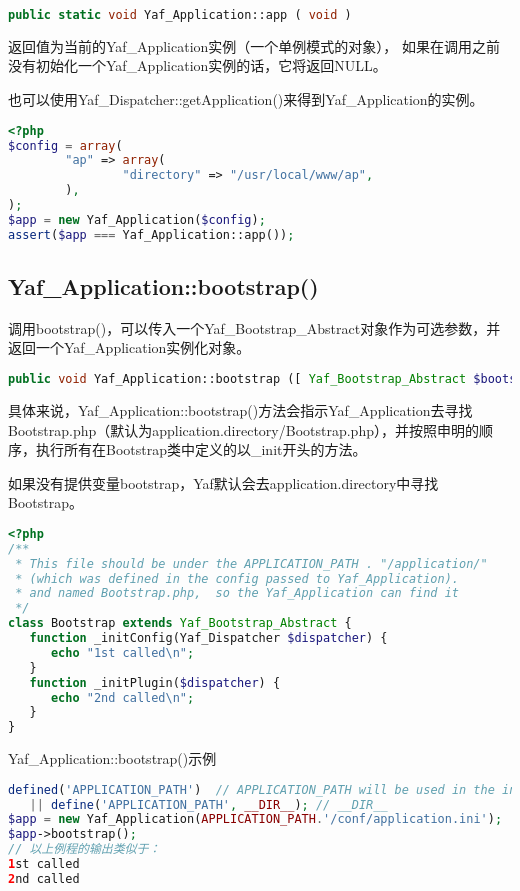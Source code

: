 \begin{lstlisting}[language=PHP]
public static void Yaf_Application::app ( void )
\end{lstlisting}

返回值为当前的Yaf\_Application实例（一个单例模式的对象）， 如果在调用之前没有初始化一个Yaf\_Application实例的话，它将返回NULL。

也可以使用Yaf\_Dispatcher::getApplication()来得到Yaf\_Application的实例。


\begin{lstlisting}[language=PHP]
<?php
$config = array(
        "ap" => array(
                "directory" => "/usr/local/www/ap",
        ),
);
$app = new Yaf_Application($config);
assert($app === Yaf_Application::app());
\end{lstlisting}








\subsection{Yaf\_Application::bootstrap()}

调用bootstrap()，可以传入一个Yaf\_Bootstrap\_Abstract对象作为可选参数，并返回一个Yaf\_Application实例化对象。

\begin{lstlisting}[language=PHP]
public void Yaf_Application::bootstrap ([ Yaf_Bootstrap_Abstract $bootstrap ] )
\end{lstlisting}

具体来说，Yaf\_Application::bootstrap()方法会指示Yaf\_Application去寻找Bootstrap.php（默认为application.directory/Bootstrap.php），并按照申明的顺序，执行所有在Bootstrap类中定义的以\_init开头的方法。 

如果没有提供变量bootstrap，Yaf默认会去application.directory中寻找Bootstrap。

\begin{lstlisting}[language=PHP]
<?php
/**
 * This file should be under the APPLICATION_PATH . "/application/"
 * (which was defined in the config passed to Yaf_Application).
 * and named Bootstrap.php,  so the Yaf_Application can find it 
 */
class Bootstrap extends Yaf_Bootstrap_Abstract {
   function _initConfig(Yaf_Dispatcher $dispatcher) {
      echo "1st called\n";
   }
   function _initPlugin($dispatcher) {
      echo "2nd called\n";
   }
}
\end{lstlisting}

\begin{example}
Yaf\_Application::bootstrap()示例
\begin{lstlisting}[language=PHP]
defined('APPLICATION_PATH')  // APPLICATION_PATH will be used in the ini config file
   || define('APPLICATION_PATH', __DIR__); // __DIR__
$app = new Yaf_Application(APPLICATION_PATH.'/conf/application.ini');
$app->bootstrap();
// 以上例程的输出类似于：
1st called
2nd called
\end{lstlisting}
\end{example}

